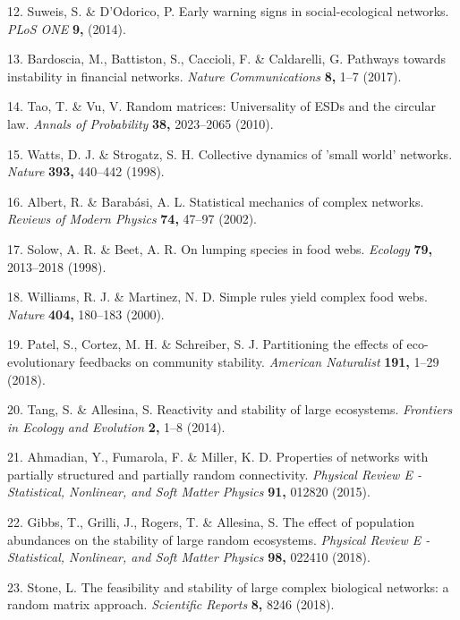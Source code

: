 \documentclass[]{article}
\begin{document}
\hypertarget{ref-Suweis2014}{}
12. Suweis, S. \& D'Odorico, P. Early warning signs in social-ecological
networks. \emph{PLoS ONE} \textbf{9,} (2014).

\hypertarget{ref-Bardoscia2017}{}
13. Bardoscia, M., Battiston, S., Caccioli, F. \& Caldarelli, G.
Pathways towards instability in financial networks. \emph{Nature
Communications} \textbf{8,} 1--7 (2017).

\hypertarget{ref-Tao2010}{}
14. Tao, T. \& Vu, V. Random matrices: Universality of ESDs and the
circular law. \emph{Annals of Probability} \textbf{38,} 2023--2065
(2010).

\hypertarget{ref-Watts1998}{}
15. Watts, D. J. \& Strogatz, S. H. Collective dynamics of 'small world'
networks. \emph{Nature} \textbf{393,} 440--442 (1998).

\hypertarget{ref-Albert2002}{}
16. Albert, R. \& Barabási, A. L. Statistical mechanics of complex
networks. \emph{Reviews of Modern Physics} \textbf{74,} 47--97 (2002).

\hypertarget{ref-Solow1998}{}
17. Solow, A. R. \& Beet, A. R. On lumping species in food webs.
\emph{Ecology} \textbf{79,} 2013--2018 (1998).

\hypertarget{ref-Williams2000}{}
18. Williams, R. J. \& Martinez, N. D. Simple rules yield complex food
webs. \emph{Nature} \textbf{404,} 180--183 (2000).

\hypertarget{ref-Patel2018}{}
19. Patel, S., Cortez, M. H. \& Schreiber, S. J. Partitioning the
effects of eco-evolutionary feedbacks on community stability.
\emph{American Naturalist} \textbf{191,} 1--29 (2018).

\hypertarget{ref-Tang2014b}{}
20. Tang, S. \& Allesina, S. Reactivity and stability of large
ecosystems. \emph{Frontiers in Ecology and Evolution} \textbf{2,} 1--8
(2014).

\hypertarget{ref-Ahmadian2015}{}
21. Ahmadian, Y., Fumarola, F. \& Miller, K. D. Properties of networks
with partially structured and partially random connectivity.
\emph{Physical Review E - Statistical, Nonlinear, and Soft Matter
Physics} \textbf{91,} 012820 (2015).

\hypertarget{ref-Gibbs2017}{}
22. Gibbs, T., Grilli, J., Rogers, T. \& Allesina, S. The effect of
population abundances on the stability of large random ecosystems.
\emph{Physical Review E - Statistical, Nonlinear, and Soft Matter
Physics} \textbf{98,} 022410 (2018).

\hypertarget{ref-Stone2017}{}
23. Stone, L. The feasibility and stability of large complex biological
networks: a random matrix approach. \emph{Scientific Reports}
\textbf{8,} 8246 (2018).
\end{document}
